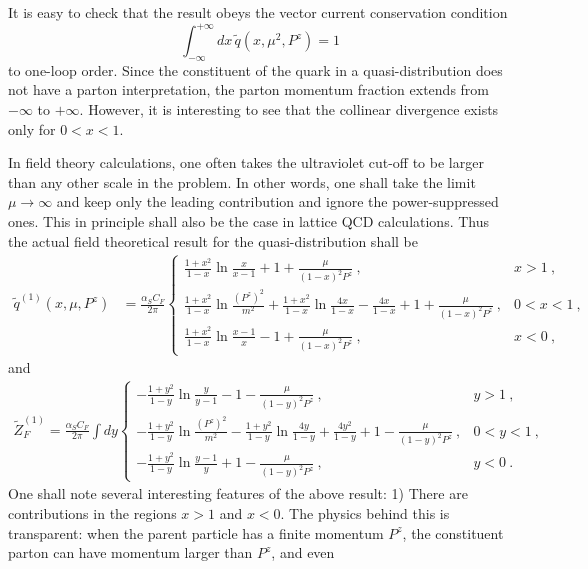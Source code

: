 It is easy to check that the result obeys the vector current conservation condition
\begin{equation}
  \int^{+\infty}_{-\infty} dx\, \tilde q(x, \mu^2, P^z) =1
\end{equation}
to one-loop order. Since the constituent of the quark in a quasi-distribution does not have a parton interpretation,
the parton momentum fraction extends from $-\infty$ to $+\infty$. However, it is interesting to see that the collinear divergence
exists only for $0<x<1$.


In field theory calculations, one often takes the ultraviolet cut-off to be larger than any other scale
in the problem. In other words, one shall take the limit $\mu\rightarrow \infty$ and keep only the leading
contribution and ignore the power-suppressed ones. This in principle shall also be the case in lattice QCD calculations. Thus the actual field theoretical result for the quasi-distribution
shall be
\begin{align}\label{unpolvertex}
\tilde q^{(1)}(x,\mu,P^z)&=\frac{\alpha_S C_F}{2\pi} \left\{ \begin{array} {ll} \frac{1+x^2}{1-x}\ln \frac{x}{x-1}+1+\frac{\mu}{(1-x)^2P^z}\ , & x>1\ , \\ \frac{1+x^2}{1-x}\ln \frac{(P^z)^2}{m^2}+\frac{1+x^2}{1-x}\ln\frac{4x}{1-x}-\frac{4x}{1-x}+1+\frac{\mu}{(1-x)^2P^z}\ , & 0<x<1\ , \\ \frac{1+x^2}{1-x}\ln \frac{x-1}{x}-1+\frac{\mu}{(1-x)^2P^z}\ , & x<0\ , \end{array} \right.
\end{align}
and
\begin{align}\label{unpolself}
\tilde Z^{(1)}_F
=\frac{\alpha_S C_F}{2\pi} \int dy \left\{ \begin{array} {ll} -\frac{1+y^2}{1-y}\ln \frac{y}{y-1}-1-\frac{\mu}{(1-y)^2P^z}\ , & y>1\ , \\ -\frac{1+y^2}{1-y}\ln \frac{(P^z)^2}{m^2}-\frac{1+y^2}{1-y}\ln\frac{4y}{1-y}+\frac{4y^2}{1-y}+1-\frac{\mu}{(1-y)^2P^z}\ , & 0<y<1\ , \\ -\frac{1+y^2}{1-y}\ln \frac{y-1}{y}+1-\frac{\mu}{(1-y)^2P^z}\ , & y<0\ . \end{array} \right.
\end{align}
One shall note several interesting features of the above result: 1) There are contributions in the regions $x>1$ and $x<0$. The physics
behind this is transparent: when the parent particle has a finite momentum $P^z$, the constituent parton can have momentum larger than $P^z$, and even
